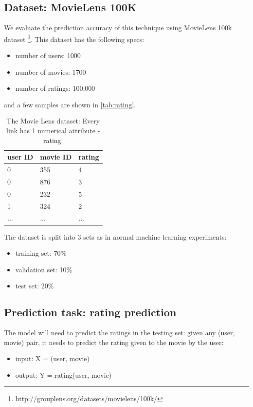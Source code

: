 \documentclass{article}
\begin{document}
\subsection{Dataset: MovieLens 100K}
We evaluate the prediction accuracy of this technique using MovieLens 100k 
dataset \cite{harper2015movielens} 
\footnote{http://grouplens.org/datasets/movielens/100k/}. This dataset has the 
following specs:
\begin{itemize}
	\item number of users: 1000
	\item number of movies: 1700
	\item number of ratings: 100,000
\end{itemize}
and a few samples are shown in \autoref{tab:rating}.
\begin{table}[h]
	\centering
	\begin{tabularx}{0.5\textwidth}{ |X|X|X| }  \hline
		user ID & movie ID & rating \\ \hline
		0 & 355 & 4 \\ \hline
		0 & 876 & 3 \\ \hline
		0 & 232 & 5 \\ \hline
		1 & 324 & 2 \\ \hline
		... & ... & ... \\ \hline
	\end{tabularx}
	\caption{The Movie Lens dataset: Every link has 1 numerical attribute - 
	rating.}
	\label{tab:rating}
\end{table}
The dataset is split into 3 sets as in normal machine learning experiments:
\begin{itemize}
	\item training set: 70\%
	\item validation set: 10\%
	\item test set: 20\%
\end{itemize}

\subsection{Prediction task: rating prediction}
The model will need to predict the ratings in the testing set: given any (user, 
movie) pair, it needs to predict the rating given to the movie by the user:
\begin{itemize}
	\item input: X = (user, movie)
	\item output: Y = rating(user, movie)
\end{itemize}
\end{document}
